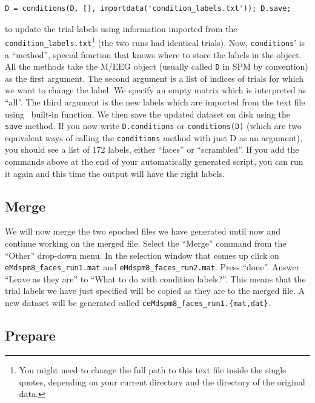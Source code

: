 \begin{verbatim}
D = conditions(D, [], importdata('condition_labels.txt')); D.save;
\end{verbatim}
to update the trial labels using information imported from the \texttt{condition\_labels.txt}\footnote{You might need to change the full path to this text file inside the single quotes, depending on your current directory and the directory of the original data.} (the two runs had identical trials). Now, \texttt{conditions}' is a ``method'', special function that knows where to store the labels in the object. All the methods take the M/EEG object (usually called \texttt{D} in SPM by convention) as the first argument. The second argument is a list of indices of trials for which we want to change the label. We specify an empty matrix which is interpreted as ``all''. The third argument is the new labels which are imported from the text file using \matlab\ built-in function. We then save the updated dataset on disk using the \texttt{save} method. If you now write \texttt{D.conditions} or \texttt{conditions(D)} (which are two equivalent ways of calling the \texttt{conditions} method with just D as an argument), you should see a list of 172 labels, either ``faces'' or ``scrambled''. If you add the commands above at the end of your automatically generated script, you can run it again and this time the output will have the right labels.

\subsection{Merge}

We will now merge the two epoched files we have generated until now and continue working on the merged file. Select the ``Merge'' command from the ``Other'' drop-down menu. In the selection window that comes up click on \texttt{eMdspm8\_faces\_run1.mat} and \texttt{eMdspm8\_faces\_run2.mat}. Press ``done''. Answer ``Leave as they are'' to ``What to do with condition labels?''. This means that the trial labels we have just specified will be copied as they are to the merged file. A new dataset will be generated called \texttt{ceMdspm8\_faces\_run1.\{mat,dat\}}.

\subsection{Prepare}


